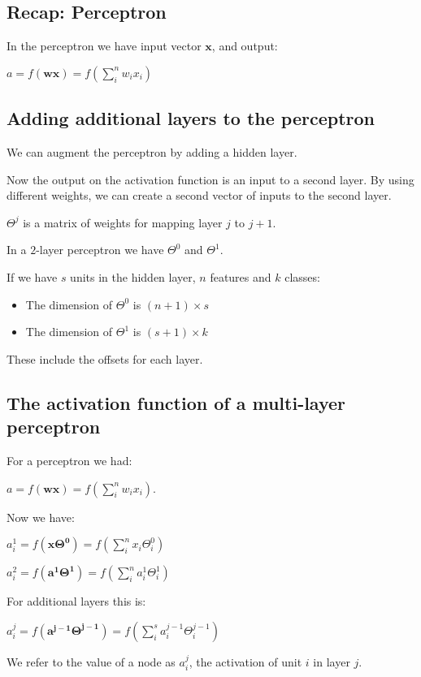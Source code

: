 
\subsection{Recap: Perceptron}

In the perceptron we have input vector \(\textbf{x}\), and output:

\(a=f(\textbf{wx})=f(\sum_i^n {w_ix_i})\)


\subsection{Adding additional layers to the perceptron}

We can augment the perceptron by adding a hidden layer.

Now the output on the activation function is an input to a second layer. By using different weights, we can create a second vector of inputs to the second layer.

\(\Theta^{j}\) is a matrix of weights for mapping layer \(j\) to \(j+1\).

In a \(2\)-layer perceptron we have \(\Theta^0\) and \(\Theta^1\).

If we have \(s\) units in the hidden layer, \(n\) features and \(k\) classes:

\begin{itemize}
\item The dimension of \(\Theta^0\) is \((n+1) \times s\)
\item The dimension of \(\Theta^1\) is \((s+1) \times k\)
\end{itemize}

These include the offsets for each layer.

\subsection{The activation function of a multi-layer perceptron}

For a perceptron we had:

\(a=f(\textbf{wx})=f(\sum_i^n{w_ix_i})\).

Now we have:

\(a_i^1=f(\boldsymbol{x\Theta^0 })=f(\sum_i^n{x_i\Theta_i^0 })\)


\(a_i^2=f(\boldsymbol{a^1\Theta^1 })=f(\sum_i^n{a_i^1\Theta_i^1 })\)


For additional layers this is:

\(a_i^j=f(\boldsymbol{a^{j-1}\Theta^{j-1} })=f(\sum_i^s{a_i^{j-1}\Theta_i^{j-1} })\)

We refer to the value of a node as \(a_i^{j}\), the activation of unit \(i\) in layer \(j\).

